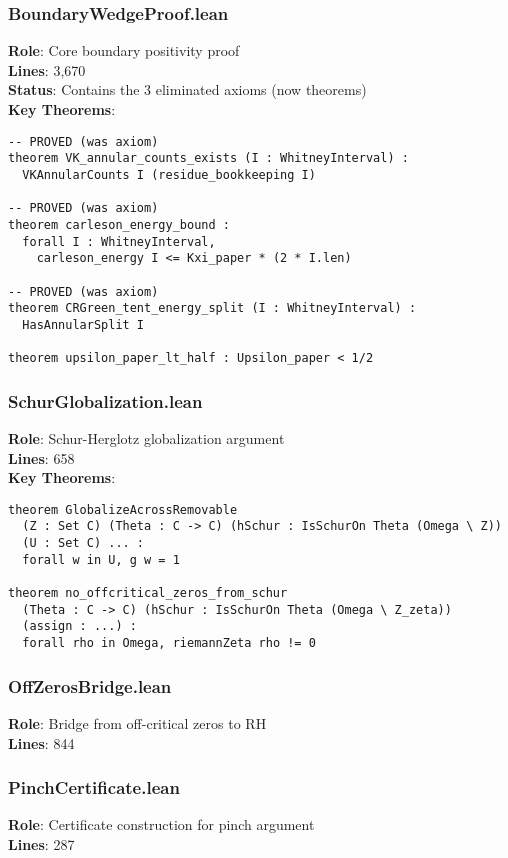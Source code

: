 \documentclass[12pt,a4paper]{article}
\begin{document}
\subsubsection{BoundaryWedgeProof.lean}
\textbf{Role}: \colorbox{yellow!30}{Core boundary positivity proof}\\
\textbf{Lines}: 3,670\\
\textbf{Status}: Contains the 3 eliminated axioms (now theorems)\\
\textbf{Key Theorems}:
\begin{lstlisting}[language=Lean]
-- PROVED (was axiom)
theorem VK_annular_counts_exists (I : WhitneyInterval) :
  VKAnnularCounts I (residue_bookkeeping I)

-- PROVED (was axiom)
theorem carleson_energy_bound :
  forall I : WhitneyInterval,
    carleson_energy I <= Kxi_paper * (2 * I.len)

-- PROVED (was axiom)
theorem CRGreen_tent_energy_split (I : WhitneyInterval) :
  HasAnnularSplit I

theorem upsilon_paper_lt_half : Upsilon_paper < 1/2
\end{lstlisting}

\subsubsection{SchurGlobalization.lean}
\textbf{Role}: Schur-Herglotz globalization argument\\
\textbf{Lines}: 658\\
\textbf{Key Theorems}:
\begin{lstlisting}[language=Lean]
theorem GlobalizeAcrossRemovable
  (Z : Set C) (Theta : C -> C) (hSchur : IsSchurOn Theta (Omega \ Z))
  (U : Set C) ... :
  forall w in U, g w = 1

theorem no_offcritical_zeros_from_schur
  (Theta : C -> C) (hSchur : IsSchurOn Theta (Omega \ Z_zeta))
  (assign : ...) :
  forall rho in Omega, riemannZeta rho != 0
\end{lstlisting}

\subsubsection{OffZerosBridge.lean}
\textbf{Role}: Bridge from off-critical zeros to RH\\
\textbf{Lines}: 844

\subsubsection{PinchCertificate.lean}
\textbf{Role}: Certificate construction for pinch argument\\
\textbf{Lines}: 287
\end{document}
